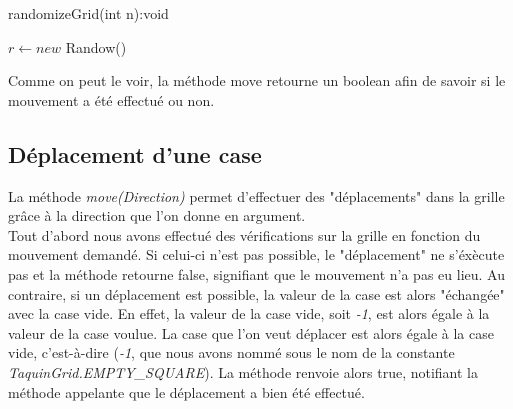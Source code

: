 			\begin{algorithm}[H]
				\caption{randomizeGrid(int n):void}
				$r\leftarrow new$ Randow()

			\end{algorithm}

			Comme on peut le voir, la méthode move retourne un boolean afin de savoir si le mouvement a été effectué ou non.

		\subsection{Déplacement d'une case}

			La méthode \textit{move(Direction)} permet d'effectuer des "déplacements" dans la grille grâce à la direction que l'on donne en argument.\\
			Tout d'abord nous avons effectué des vérifications sur la grille en fonction du mouvement demandé. Si celui-ci n'est pas possible, le "déplacement" ne s'éxècute pas et la méthode retourne false, signifiant que le mouvement n'a pas eu lieu. Au contraire, si un déplacement est possible, la valeur de la case est alors "échangée" avec la case vide. En effet, la valeur de la case vide, soit \textit{-1}, est alors égale à la valeur de la case voulue. La case que l'on veut déplacer est alors égale à la case vide, c'est-à-dire (\textit{-1}, que nous avons nommé sous le nom de la constante \textit{TaquinGrid.EMPTY\_SQUARE}). La méthode renvoie alors true, notifiant la méthode appelante que le déplacement a bien été effectué.

